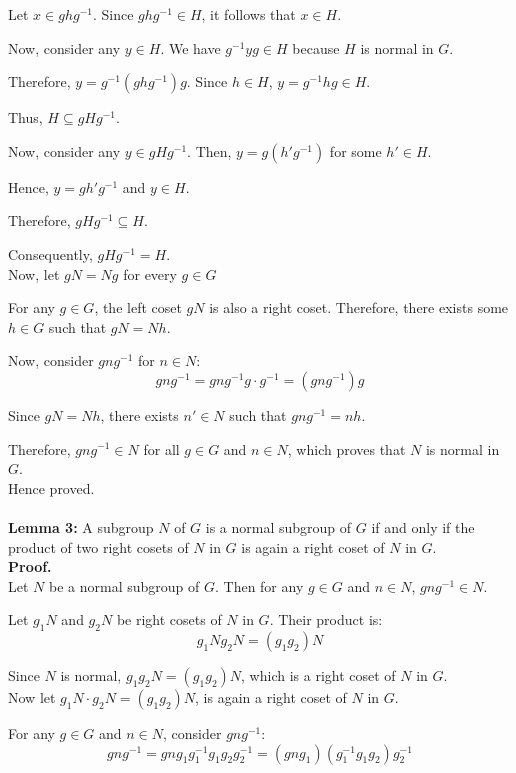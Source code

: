 Let \( x \in ghg^{-1} \). Since \( ghg^{-1} \in H \), it follows that \( x \in H \).

Now, consider any \( y \in H \). We have \( g^{-1}yg \in H \) because \( H \) is normal in \( G \).

Therefore, \( y = g^{-1}(ghg^{-1})g \). Since \( h \in H \), \( y = g^{-1}hg \in H \).

Thus, \( H \subseteq gHg^{-1} \).

Now, consider any \( y \in gHg^{-1} \). Then, \( y = g(h'g^{-1}) \) for some \( h' \in H \).

Hence, \( y = gh'g^{-1} \) and \( y \in H \).

Therefore, \( gHg^{-1} \subseteq H \).

Consequently, \( gHg^{-1} = H \).
\\
Now, let \( gN = Ng \) for every \( g \in G \)

For any \( g \in G \), the left coset \( gN \) is also a right coset. Therefore, there exists some \( h \in G \) such that \( gN = Nh \).

Now, consider \( gng^{-1} \) for \( n \in N \):
\[ gng^{-1} = gng^{-1}g \cdot g^{-1} = (gng^{-1})g \]

Since \( gN = Nh \), there exists \( n' \in N \) such that \( gng^{-1} = nh \).

Therefore, \( gng^{-1} \in N \) for all \( g \in G \) and \( n \in N \), which proves that \( N \) is normal in \( G \).
\\
Hence proved.\\
\\
\textbf{Lemma 3:} A subgroup \( N \) of \( G \) is a normal subgroup of \( G \) if and only if the product of two right cosets of \( N \) in \( G \) is again a right coset of \( N \) in \( G \).
\\
\textbf{Proof.}
\\
Let \( N \) be a normal subgroup of \( G \). Then for any \( g \in G \) and \( n \in N \), \( gng^{-1} \in N \).

Let \( g_1N \) and \( g_2N \) be right cosets of \( N \) in \( G \). Their product is:
\[ g_1Ng_2N = (g_1g_2)N \]

Since \( N \) is normal, \( g_1g_2N = (g_1g_2)N \), which is a right coset of \( N \) in \( G \).
\\
Now let \( g_1N \cdot g_2N = (g_1g_2)N \), is again a right coset of \( N \) in \( G \).

For any \( g \in G \) and \( n \in N \), consider \( gng^{-1} \):
\[ gng^{-1} = gng_1g_1^{-1}g_1g_2g_2^{-1} = (gng_1)(g_1^{-1}g_1g_2)g_2^{-1} \]

